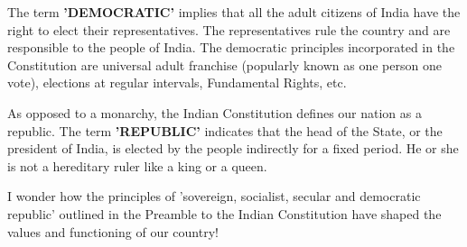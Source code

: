 \vspace{0.4in}
\par
The term \textbf{'DEMOCRATIC'} implies that all the adult citizens of India have the right to elect their representatives. The representatives rule the country and are responsible to the people of India. The democratic principles incorporated in the Constitution are universal adult franchise (popularly known as one person one vote), elections at regular intervals, Fundamental Rights, etc.
\vspace{0.1in}
\par
As opposed to a monarchy, the Indian Constitution defines our nation as a republic. The term \textbf{'REPUBLIC'} indicates that the head of the State, or the president of India, is elected by the people indirectly for a fixed period. He or she is not a hereditary ruler like a king or a queen.
\vspace{0.3in}
\par
I wonder how the principles of 'sovereign, socialist, secular and democratic republic' outlined in the Preamble to the Indian Constitution have shaped the values and functioning of our country!
